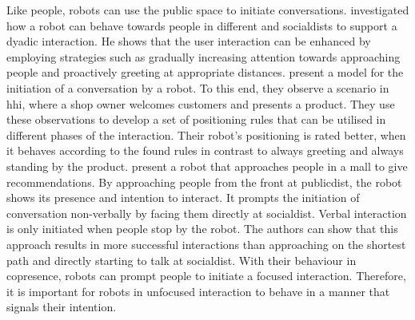 Like people, \glspl{robot} can use the public space to initiate \glspl{conversation}.
 investigated how a \gls{robot} can behave towards people in different  and \glspl{socialdist} to support a dyadic interaction.
He shows that the user interaction can be enhanced by employing strategies such as gradually increasing attention towards approaching people and proactively greeting at appropriate distances.
 present a model for the initiation of a \gls{conversation} by a \gls{robot}.
To this end, they observe a scenario in \gls{hhi}, where a shop owner welcomes customers and presents a product.
They use these observations to develop a set of positioning rules that can be utilised in different phases of the interaction.
Their \gls{robot}'s positioning is rated better, when it behaves according to the found rules in contrast to always greeting and always standing by the product.
 present a \gls{robot} that approaches people in a mall to give recommendations.
By approaching people from the front at \gls{publicdist}, the \gls{robot} shows its presence and intention to interact.
It prompts the initiation of \gls{conversation} non-verbally by facing them directly at \gls{socialdist}.
Verbal interaction is only initiated when people stop by the \gls{robot}.
The authors can show that this approach results in more successful interactions than approaching on the shortest path and directly starting to talk at \gls{socialdist}.
With their behaviour in \gls{copresence}, \glspl{robot} can prompt people to initiate a \gls{focused interaction}.
Therefore, it is important for \glspl{robot} in \gls{unfocused interaction} to behave in a manner that signals their intention.

